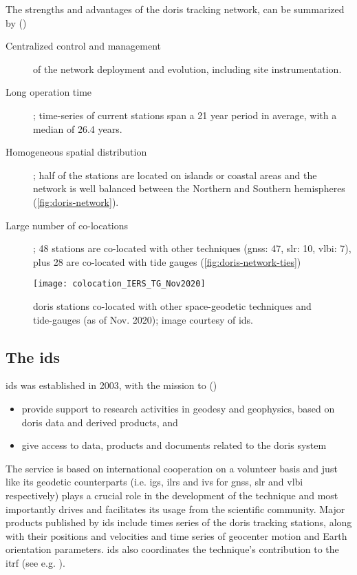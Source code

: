 The strengths and advantages of the \gls{doris} tracking network, can be summarized 
by (\cite{Soudarin2019})
\begin{description}
  \item[Centralized control and management] of the network deployment and evolution, 
    including site instrumentation.
  \item[Long operation time]; time-series of current stations span a 21 year period in average, 
    with a median of 26.4 years.
  \item[Homogeneous spatial distribution]; half of the stations are located on 
    islands or coastal areas and the network is well balanced between the 
    Northern and Southern hemispheres (\autoref{fig:doris-network}).
  \item[Large number of co-locations]; 48 stations are co-located with 
    other techniques (\gls{gnss}: 47, \gls{slr}: 10, \gls{vlbi}: 7), plus 28 are 
    co-located with tide gauges (\autoref{fig:doris-network-ties})
\end{description}

\begin{figure}[h]
  \centering
  \texttt{[image: colocation\_IERS\_TG\_Nov2020]}
  \caption{\gls{doris} stations co-located with other space-geodetic techniques 
    and tide-gauges (as of Nov. 2020); image courtesy of \gls{ids}.}
  \label{fig:doris-network-ties}
\end{figure}

\subsection{The \gls{ids}}\label{ssec:ids}
\gls{ids} was established in 2003, with the mission to (\cite{Soudarin2019})
\begin{itemize}
  \item provide support to research activities in geodesy and geophysics, based 
    on \gls{doris} data and derived products, and
  \item give access to data, products and documents related to the \gls{doris} system
\end{itemize}

The service is based on international cooperation on a volunteer basis and just like 
its geodetic counterparts (i.e. \gls{igs}, \gls{ilrs} and \gls{ivs} for \gls{gnss}, 
\gls{slr} and \gls{vlbi} respectively) plays a crucial role in the development of 
the technique and most importantly drives and facilitates its usage from the scientific 
community. Major products published by \gls{ids} include times series of the \gls{doris} 
tracking stations, along with their positions and velocities  and time series of 
geocenter motion and Earth orientation parameters. \gls{ids} also coordinates the 
technique's contribution to the \gls{itrf} (see e.g. \cite{Moreaux2022}).

